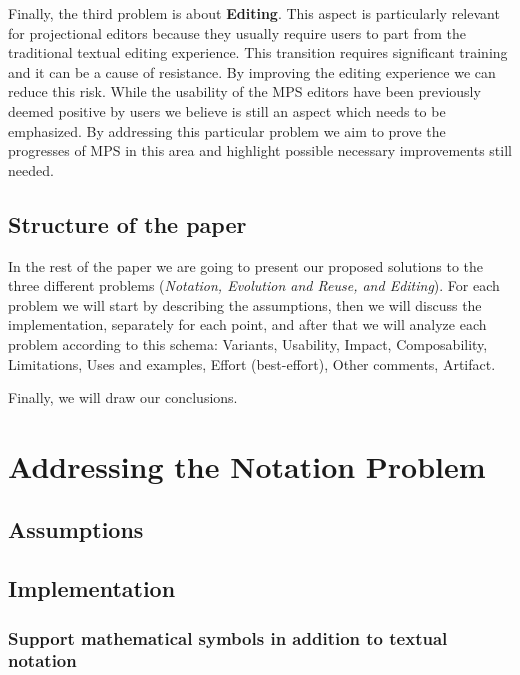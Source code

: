 \documentclass[preprint,numbers,10pt]{sigplanconf}
\begin{document}
Finally, the third problem is about \textbf{Editing}. This aspect is particularly relevant for projectional editors because they usually require users to part from the traditional textual editing experience. This transition requires significant training and it can be a cause of resistance. By improving the editing experience we can reduce this risk. While the usability of the MPS editors have been previously deemed positive by users \cite{Voelter2014} we believe is still an aspect which needs to be emphasized. By addressing this particular problem we aim to prove the progresses of MPS in this area and highlight possible necessary improvements still needed.

\subsection{Structure of the paper}

In the rest of the paper we are going to present our proposed solutions to the three different problems (\emph{Notation, Evolution and Reuse, and Editing}). For each problem we will start by describing the assumptions, then we will discuss the implementation, separately for each point, and after that we will analyze each problem according to this schema: Variants, Usability, Impact, Composability, Limitations, Uses and examples, Effort (best-effort), Other comments, Artifact.

Finally, we will draw our conclusions.

%
%

\section{Addressing the Notation Problem}

\subsection{Assumptions}

\subsection{Implementation}

\subsubsection{Support mathematical symbols in addition to textual notation}
\end{document}
